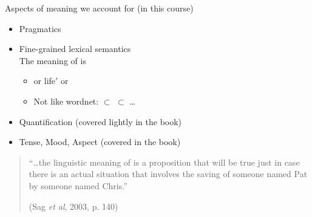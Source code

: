 \documentclass[a4paper,landscape,headrule,footrule]{foils}
\begin{document}
Aspects of meaning we  account for (in this course)
\begin{itemize}
\item Pragmatics
\item Fine-grained lexical semantics
  \\ The meaning of  is
  \begin{itemize}\addtolength{\itemsep}{2ex}
  \item {}  
or 
\textsf{life}$'$
or
\item Not like wordnet: 
  $\subset$  $\subset$  \ldots

 \end{itemize}
\item Quantification \hfill (covered lightly in the book)
\item Tense, Mood, Aspect \hfill (covered in the book)
 \end{itemize}



\noindent{} 
\begin{quote}
  “\ldots the linguistic meaning of  is a proposition
  that will be true just in case there is an actual situation that
  involves the saving of someone named Pat by someone named Chris.”
  \begin{flushright}
    (Sag \textit{et al}, 2003, p. 140)
  \end{flushright}
\end{quote}
\end{document}

